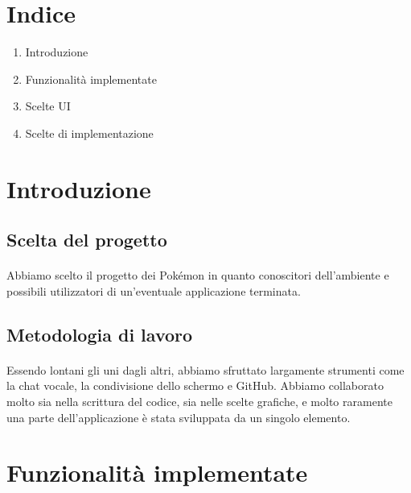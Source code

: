 \documentclass[a4paper,11pt]{article}
\begin{document}
	\section{Indice}
		\begin{enumerate}
			\item Introduzione
			\item Funzionalità implementate
			\item Scelte UI
			\item Scelte di implementazione
		\end{enumerate}
	\newpage
	
	\section{Introduzione}
		\subsection{Scelta del progetto}
			\paragraph{}
				Abbiamo scelto il progetto dei Pokémon in quanto conoscitori dell’ambiente e possibili utilizzatori di un’eventuale applicazione terminata.
		\subsection{Metodologia di lavoro}
			\paragraph{}
				Essendo lontani gli uni dagli altri, abbiamo sfruttato largamente strumenti come la chat vocale, la condivisione dello schermo e GitHub. Abbiamo collaborato molto sia nella scrittura del codice, sia nelle scelte grafiche, e molto raramente una parte dell’applicazione è stata sviluppata da un singolo elemento.\newpage
	
	\section{Funzionalità implementate}
\end{document}
